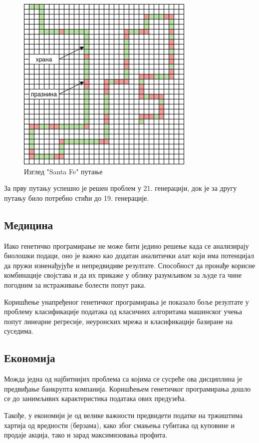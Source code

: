 \documentclass[a4paper]{article}
\begin{document}
\begin{figure}[h!]
    \begin{center}
        \includegraphics[scale=0.45]{santa_fe.png}
    \end{center}
    \caption{Изглед "Santa Fe" путање}
    \label{fig:santa_fe}
\end{figure}

За прву путању успешно је решен проблем у 21. генерацији, док је за другу путању било потребно стићи до 19. генерације. \cite{koza} 
\subsection{Медицина}
Иако генетичко програмирање не може бити једино решење када се анализирају биолошки подаци, оно је важно као додатан аналитички алат који има потенцијал да пружи изненађујуће и непредвидиве резултате. Способност да пронађе корисне комбинације својстава и да их прикаже у облику разумљивом за људе га чине погодним за истраживање болести попут рака. \cite{cancer}

Коришћење унапређеног генетичког програмирања је показало боље резултате у проблему класификације података од класичних алгоритама машинског учења попут линеарне регресије, неуронских мрежа и класификације базиране на суседима. \cite{egp}
\subsection{Економија}
Можда једна од најбитнијих проблема са којима се сусреће ова дисциплина је предвиђање банкрупта компанија. Коришћењем генетичког програмирања дошло се до занимљивих карактеристика података ових предузећа. \cite{bankruptcy}

Такође, у економији је од велике важности предвидети податке на тржиштима хартија од вредности (берзама), како због смањења губитака од куповине и продаје акција, тако и зарад максимизовања профита. \cite{stock}
\end{document}
